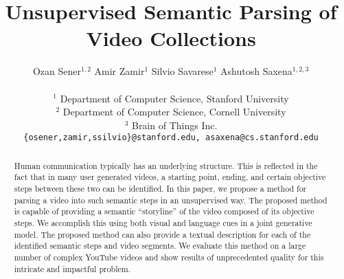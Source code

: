 \documentclass[10pt,twocolumn,letterpaper]{article}
\begin{document}
\title{Unsupervised Semantic Parsing of Video Collections}



\author{ Ozan Sener$^{1,2}$ \;\; Amir Zamir$^{1}$ \;\; Silvio Savarese$^{1}$ \;\; Ashutosh Saxena$^{1,2,3}$  \\ \\
$^1$ Department of Computer Science, Stanford University\\
$^2$ Department of Computer Science, Cornell University\\
$^3$ Brain of Things Inc.\\
{\tt\small \{osener,zamir,ssilvio\}@stanford.edu, asaxena@cs.stanford.edu}
}
\maketitle


\begin{spacing}{0.98}
\begin{abstract}
\vspace{-2mm}
Human communication typically has an underlying structure. This is reflected in the fact that in many user generated videos, a starting point, ending, and certain objective steps between these two can be identified. In this paper, we propose a method for parsing a video into such semantic steps in an unsupervised way. The proposed method is capable of providing a semantic ``storyline'' of the video composed of its objective steps. We accomplish this using both visual and language cues in a joint generative model. The proposed method can also provide a textual description for each of the identified semantic steps and video segments. We evaluate this method on a large number of complex YouTube videos and show results of unprecedented quality for this intricate and impactful problem.
\end{abstract}
\vspace{-5mm}







%
\end{spacing}
{\footnotesize
\begin{spacing}{0.88}


\end{spacing}
}
\end{document}
